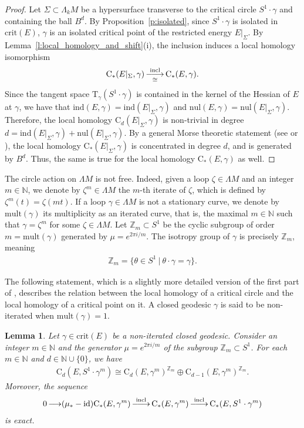 \documentclass[reqno]{amsart}
\numberwithin{equation}{section}
\theoremstyle{personal}%
\newtheorem{lem}[thm]{Lemma}
\theoremstyle{definition}
\newcommand{\N}{\mathds{N}}
\newcommand{\Z}{\mathds{Z}}
\newcommand{\incl}{\mathrm{incl}}
\newcommand{\Tan}{\mathrm{T}}
\newcommand{\mul}{\mathrm{mult}}
\newcommand{\crit}{\mathrm{crit}}
\newcommand{\Loc}{\mathrm{C}}
\newcommand{\ind}{\mathrm{ind}}
\newcommand{\nul}{\mathrm{nul}}
\DeclareRobustCommand{\llongrightarrow}{\relbar\joinrel\relbar\joinrel\rightarrow}
\DeclareMathOperator*{\toup}{\longrightarrow}
\DeclareMathOperator*{\ttoup}{\llongrightarrow}
\begin{document}
\begin{proof}
Let $\Sigma\subset\Lambda_kM$ be a hypersurface transverse to the critical circle $S^1\cdot\gamma$ and containing the ball $B^d$. By Proposition~\ref{p:isolated}, since $S^1\cdot\gamma$ is isolated in $\crit(E)$, $\gamma$ is an isolated critical point of the restricted energy $E|_{\Sigma}$. By Lemma~\ref{l:local_homology_and_shift}(i), the inclusion induces a local homology isomorphism
\begin{align*}
\Loc_*(E|_{\Sigma},\gamma)
\ttoup_{\cong}^{\incl}
\Loc_*(E,\gamma).
\end{align*}
Since the tangent space $\Tan_{\gamma}(S^1\cdot\gamma)$ is contained in the kernel of the Hessian of $E$ at $\gamma$, we have that $\ind(E,\gamma)=\ind(E|_{\Sigma},\gamma)$ and $\nul(E,\gamma)=\nul(E|_{\Sigma},\gamma)$. Therefore, the local homology $\Loc_d(E|_{\Sigma},\gamma)$ is non-trivial in degree $d=\ind(E|_{\Sigma},\gamma)+\nul(E|_{\Sigma},\gamma)$. By a general Morse theoretic statement (see \cite[page~256]{Hingston:1993ou} or \cite[Prop.~2.6(ii)]{Mazzucchelli:2013co}), the local homology $\Loc_*(E|_{\Sigma},\gamma)$ is concentrated in degree $d$, and is generated by $B^d$. Thus, the same is true for the local homology $\Loc_*(E,\gamma)$ as well.
\end{proof}


The circle action on $\Lambda M$ is not free. Indeed, given a loop $\zeta\in\Lambda M$ and an integer $m\in\N$, we denote by $\zeta^m\in\Lambda M$ the $m$-th iterate of $\zeta$, which is defined by $\zeta^m(t)=\zeta(mt)$. If a loop $\gamma\in\Lambda M$ is not a stationary curve, we denote by $\mul(\gamma)$ its multiplicity as an iterated curve, that is, the maximal $m\in\N$ such that $\gamma=\zeta^m$ for some $\zeta\in\Lambda M$. Let $\Z_m\subset S^1$ be the cyclic subgroup of order $m=\mul(\gamma)$ generated by $\mu=e^{2\pi i/m}$. The isotropy group of $\gamma$ is precisely $\Z_m$, meaning
\begin{align*}
\Z_m=\{ \theta\in S^1\ |\ \theta\cdot\gamma=\gamma \}.
\end{align*}

The following statement, which is a slightly more detailed version of the first part of \cite[Prop.~3.2]{Bangert:2010ak}, describes the relation between the local homology of a critical circle and the local homology of a critical point on it. A closed geodesic $\gamma$ is said to be non-iterated when $\mul(\gamma)=1$.

\begin{lem}
\label{l:exact_sequence}
Let $\gamma\in\crit(E)$ be a non-iterated closed geodesic. Consider an integer $m\in\N$ and the generator $\mu=e^{2\pi i/m}$ of the subgroup $\Z_m\subset S^1$. For each $m\in\N$ and $d\in\N\cup\{0\}$, we have
\begin{align*}
\Loc_d(E,S^1\cdot\gamma^m)
\cong
\Loc_d(E,\gamma^m)^{\Z_m} \oplus \Loc_{d-1}(E,\gamma^m)^{\Z_m}.
\end{align*}
Moreover, the  sequence 
\begin{align*}
0
\toup (\mu_*-\mathrm{id})\Loc_*(E,\gamma^m)
\ttoup^{\incl}
 \Loc_*(E,\gamma^m)
\ttoup^\incl \Loc_*(E,S^1\cdot\gamma^m)
\end{align*}
is exact.
\end{lem}
\end{document}
